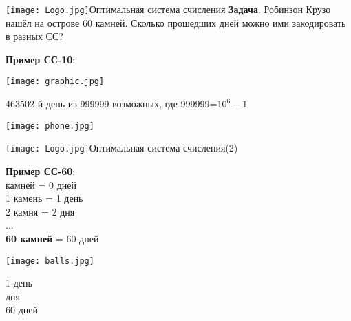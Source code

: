 \documentclass[11pt]{beamer}
\begin{document}
\begin{frame}{\texttt{[image: Logo.jpg]}Оптимальная система счисления}
\textbf{Задача}. Робинзон Крузо нашёл на острове 60 камней. Сколько прошедших дней можно ими закодировать в разных СС?
\vspace{0.8cm}

\begin{minipage}{0.27\textwidth}
\textbf{Пример СС-10}:
\end{minipage}
\begin{minipage}{0.25\textwidth}
\texttt{[image: graphic.jpg]}
\end{minipage}
\begin{minipage}{0.45\textwidth}
463502-й день из 999999 возможных, где 999999=$10^6-1$
\begin{center}
\texttt{[image: phone.jpg]}
\end{center}
\end{minipage}
\hfill
\end{frame}

\begin{frame}{\texttt{[image: Logo.jpg]}Оптимальная система счисления(2)}

\begin{minipage}{0.4\textwidth}
\textbf{Пример СС-60}:\\
 камней = 0 дней\\
1 камень = 1 день\\
2 камня = 2 дня\\
...\\
\textbf{60 камней} = 60 дней
\end{minipage}
\hfill
\begin{minipage}{0.3\textwidth}
\texttt{[image: balls.jpg]}
\end{minipage}
\hfill
\begin{minipage}{0.25\textwidth}
1 день\\
 дня\\

\vspace{0.2cm}
60 дней
\vspace{0.5cm}
\end{minipage}
\end{frame}
\end{document}
